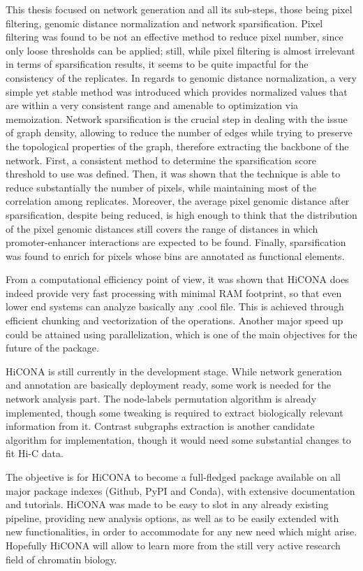 This thesis focused on network generation and all its sub-steps, those being pixel filtering, genomic distance normalization and network sparsification. Pixel filtering was found to be not an effective method to reduce pixel number, since only loose thresholds can be applied; still, while pixel filtering is almost irrelevant in terms of sparsification results, it seems to be quite impactful for the consistency of the replicates. In regards to genomic distance normalization, a very simple yet stable method was introduced which provides normalized values that are within a very consistent range and amenable to optimization via memoization. Network sparsification is the crucial step in dealing with the issue of graph density, allowing to reduce the number of edges while trying to preserve the topological properties of the graph, therefore extracting the backbone of the network. First, a consistent method to determine the sparsification score threshold to use was defined. Then, it was shown that the technique is able to reduce substantially the number of pixels, while maintaining most of the correlation among replicates. Moreover, the average pixel genomic distance after sparsification, despite being reduced, is high enough to think that the distribution of the pixel genomic distances still covers the range of distances in which promoter-enhancer interactions are expected to be found. Finally, sparsification was found to enrich for pixels whose bins are annotated as functional elements.

From a computational efficiency point of view, it was shown that HiCONA does indeed provide very fast processing with minimal RAM footprint, so that even lower end systems can analyze basically any .cool file. This is achieved through efficient chunking and vectorization of the operations. Another major speed up could be attained using parallelization, which is one of the main objectives for the future of the package. 

HiCONA is still currently in the development stage. While network generation and annotation are basically deployment ready, some work is needed for the network analysis part. The node-labels permutation algorithm is already implemented, though some tweaking is required to extract biologically relevant information from it. Contrast subgraphs extraction is another candidate algorithm for implementation, though it would need some substantial changes to fit Hi-C data. 

The objective is for HiCONA to become a full-fledged package available on all major package indexes (Github, PyPI and Conda), with extensive documentation and tutorials. HiCONA was made to be easy to slot in any already existing pipeline, providing new analysis options, as well as to be easily extended with new functionalities, in order to accommodate for any new need which might arise. Hopefully HiCONA will allow to learn more from the still very active research field of chromatin biology.
